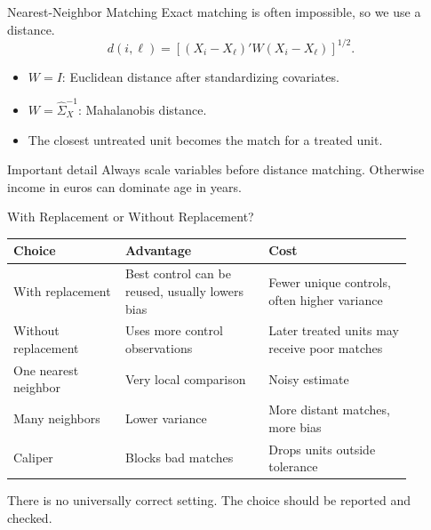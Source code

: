 \documentclass[11pt,aspectratio=169]{beamer}
\begin{document}
\begin{frame}{Nearest-Neighbor Matching}
  Exact matching is often impossible, so we use a distance.
  \[
    d(i,\ell)
    =
    \left[(X_i-X_\ell)'W(X_i-X_\ell)\right]^{1/2}.
  \]
  \begin{itemize}
    \item \(W=I\): Euclidean distance after standardizing covariates.
    \item \(W=\widehat{\Sigma}_X^{-1}\): Mahalanobis distance.
    \item The closest untreated unit becomes the match for a treated unit.
  \end{itemize}
  \begin{block}{Important detail}
    Always scale variables before distance matching. Otherwise income in euros can dominate age in years.
  \end{block}
\end{frame}

\begin{frame}{With Replacement or Without Replacement?}
  \small
  \begin{tabular}{>{\raggedright\arraybackslash}p{0.25\linewidth}>{\raggedright\arraybackslash}p{0.32\linewidth}>{\raggedright\arraybackslash}p{0.32\linewidth}}
    \toprule
    Choice & Advantage & Cost \\
    \midrule
    With replacement & Best control can be reused, usually lowers bias & Fewer unique controls, often higher variance \\
    Without replacement & Uses more control observations & Later treated units may receive poor matches \\
    One nearest neighbor & Very local comparison & Noisy estimate \\
    Many neighbors & Lower variance & More distant matches, more bias \\
    Caliper & Blocks bad matches & Drops units outside tolerance \\
    \bottomrule
  \end{tabular}
  \vspace{0.6em}

  There is no universally correct setting. The choice should be reported and checked.
\end{frame}
\end{document}
